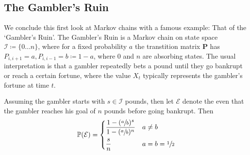 	\subsection{The Gambler's Ruin}
		We conclude this first look at Markov chains with a famous example: That of the `Gambler's 
		Ruin'. The Gambler's Ruin is a Markov chain on state space $\mathcal{I} \coloneqq\{0 \hdots 
		n\}$, where for a fixed probability
		$a$ the transtition matrix $\mathbf{P}$ has $P_{i, i+1} = a, P_{i, i-1} = b \coloneqq 1-a$, 
		where $0$ and $n$ are absorbing states. The usual interpretation is that a gambler repeatedly 
		bets a pound until they go bankrupt or reach a certain fortune, where the value $X_t$ typically
		represents the gambler's fortune at time $t$. \par

		\begin{lemma}
			Assuming the gambler starts with $s \in \mathcal{I}$ pounds, then let $\mathcal{E}$ 
			denote the even that the gambler reaches his goal of $n$ pounds before going bankrupt.
			Then
			$$
				\mathbb{P}(\mathcal{E}) = 
				\begin{dcases}
					\frac{1-(\sfrac{a}{b})^s}{1-(\sfrac{a}{b})^n} & a \neq b \\
					\frac{s}{n} & a = b = \sfrac{1}{2} 
				\end{dcases}
			$$
		\end{lemma}
